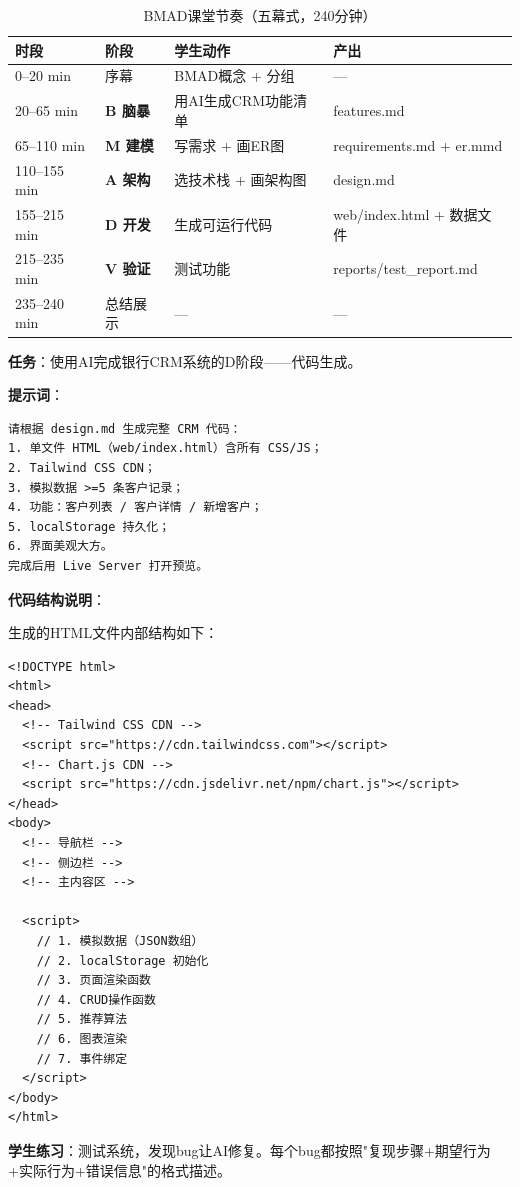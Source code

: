 \begin{table}[H]
\centering
\begin{tabular}{llll}
\toprule
\textbf{时段} & \textbf{阶段} & \textbf{学生动作} & \textbf{产出} \\
\midrule
0--20 min & 序幕 & BMAD概念 + 分组 & --- \\
20--65 min & \textbf{B 脑暴} & 用AI生成CRM功能清单 & features.md \\
65--110 min & \textbf{M 建模} & 写需求 + 画ER图 & requirements.md + er.mmd \\
110--155 min & \textbf{A 架构} & 选技术栈 + 画架构图 & design.md \\
155--215 min & \textbf{D 开发} & 生成可运行代码 & web/index.html + 数据文件 \\
215--235 min & \textbf{V 验证} & 测试功能 & reports/test\_report.md \\
235--240 min & 总结展示 & --- & --- \\
\bottomrule
\end{tabular}
\caption{BMAD课堂节奏（五幕式，240分钟）}
\end{table}

\begin{practicebox}[用AI生成CRM前端代码]
\textbf{任务}：使用AI完成银行CRM系统的D阶段——代码生成。

\textbf{提示词}：

\begin{lstlisting}
请根据 design.md 生成完整 CRM 代码：
1. 单文件 HTML（web/index.html）含所有 CSS/JS；
2. Tailwind CSS CDN；
3. 模拟数据 >=5 条客户记录；
4. 功能：客户列表 / 客户详情 / 新增客户；
5. localStorage 持久化；
6. 界面美观大方。
完成后用 Live Server 打开预览。
\end{lstlisting}

\textbf{代码结构说明}：

生成的HTML文件内部结构如下：

\begin{lstlisting}[style=html]
<!DOCTYPE html>
<html>
<head>
  <!-- Tailwind CSS CDN -->
  <script src="https://cdn.tailwindcss.com"></script>
  <!-- Chart.js CDN -->
  <script src="https://cdn.jsdelivr.net/npm/chart.js"></script>
</head>
<body>
  <!-- 导航栏 -->
  <!-- 侧边栏 -->
  <!-- 主内容区 -->

  <script>
    // 1. 模拟数据（JSON数组）
    // 2. localStorage 初始化
    // 3. 页面渲染函数
    // 4. CRUD操作函数
    // 5. 推荐算法
    // 6. 图表渲染
    // 7. 事件绑定
  </script>
</body>
</html>
\end{lstlisting}

\textbf{学生练习}：测试系统，发现bug让AI修复。每个bug都按照"复现步骤+期望行为+实际行为+错误信息"的格式描述。
\end{practicebox}

